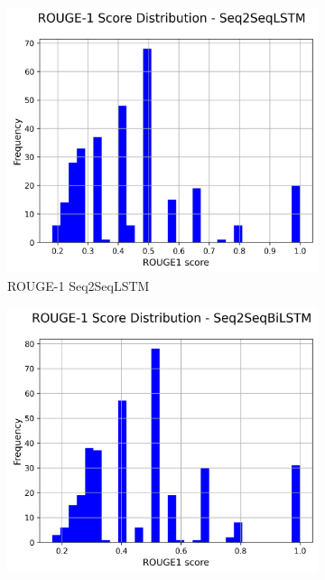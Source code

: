 \documentclass[a4paper, 12pt]{article}
\begin{document}
\begin{figure}[H]
    \centering
    \begin{subfigure}{0.32\textwidth}
        \centering
        \includegraphics[width=\textwidth]{media/Seq2SeqLSTM_rouge1_scores.png}
        \caption{ROUGE-1 Seq2SeqLSTM}
    \end{subfigure}
    \hfill
    \begin{subfigure}{0.32\textwidth}
        \centering
        \includegraphics[width=\textwidth]{media/Seq2SeqBiLSTM_rouge1_scores.png}

\end{subfigure}
\end{figure}
\end{document}

